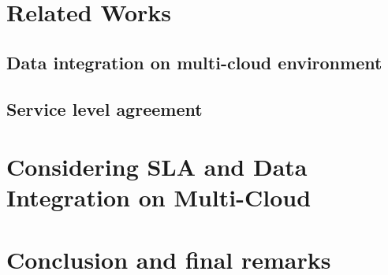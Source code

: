 \documentclass{llncs}
\begin{document}

  



\section{Related Works}

\subsection{Data integration on multi-cloud environment}

\subsection{Service level agreement}



\section{Considering SLA and Data Integration on Multi-Cloud}



\section{Conclusion and final remarks}



 
\end{document}
